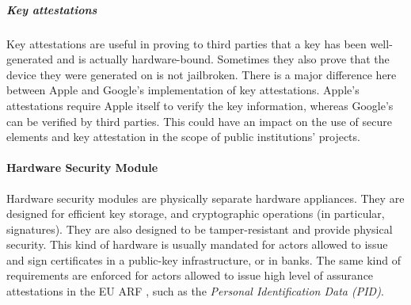 \subparagraph{Key attestations} Key attestations are useful in proving to third parties that a key has been well-generated and is actually hardware-bound. Sometimes they also prove that the device they were generated on is not jailbroken. There is a major difference here between Apple and Google's implementation of key attestations. Apple's attestations require Apple itself to verify the key information, whereas Google's can be verified by third parties. This could have an impact on the use of secure elements and key attestation in the scope of public institutions' \eid projects.

\paragraph{Hardware Security Module} Hardware security modules are physically separate hardware appliances. They are designed for efficient key storage, and cryptographic operations (in particular, signatures). They are also designed to be tamper-resistant and provide physical security. This kind of hardware is usually mandated for actors allowed to issue and sign certificates in a public-key infrastructure, or in banks. The same kind of requirements are enforced for actors allowed to issue high level of assurance attestations in the EU ARF \cite{EUDI-ARF}, such as the \emph{Personal Identification Data (PID)}.

